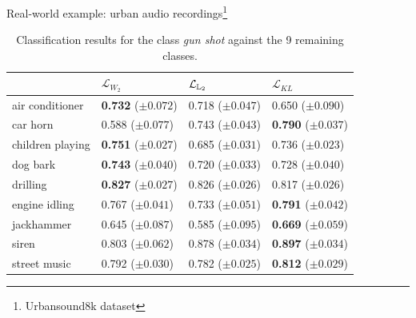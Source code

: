 \documentclass[pdf,aspectratio=169,10pt]{beamer}
\begin{document}
\begin{frame}{Real-world example: urban audio recordings\footnote{Urbansound8k dataset}}
\begin{table}[h!]
\centering
\small
\begin{tabular}{p{2.5cm}p{2.5cm}p{2.5cm}p{2.5cm}} \toprule

                    & $\mathcal{L}_{W_2}$          & $\mathcal{L}_{{\mathbb L}_2}$ & $\mathcal{L}_{KL}$         \\ \midrule 
air conditioner     & \textbf{0.732} ($\pm0.072$)  & 0.718 ($\pm0.047$) & 0.650 ($\pm0.090$)           \\
car horn            & 0.588 ($\pm0.077$)           & 0.743 ($\pm0.043$) & \textbf{0.790} ($\pm0.037$)  \\
children playing    & \textbf{0.751} ($\pm0.027$)  & 0.685 ($\pm0.031$) & 0.736 ($\pm0.023$)           \\ \midrule
dog bark            & \textbf{0.743} ($\pm0.040$)  & 0.720 ($\pm0.033$) & 0.728 ($\pm0.040$)           \\ 
drilling            & \textbf{0.827} ($\pm0.027$)  & 0.826 ($\pm0.026$) & 0.817 ($\pm0.026$)           \\ 
engine idling       & 0.767 ($\pm0.041$)           & 0.733 ($\pm0.051$) & \textbf{0.791} ($\pm0.042$)  \\ \midrule
jackhammer          & 0.645 ($\pm0.087$)           & 0.585 ($\pm0.095$) & \textbf{0.669} ($\pm0.059$)  \\
siren               & 0.803 ($\pm0.062$)           & 0.878 ($\pm0.034$) & \textbf{0.897} ($\pm0.034$)  \\
street music        & 0.792 ($\pm0.030$)           & 0.782 ($\pm0.025$) & \textbf{0.812} ($\pm0.029$)  \\ \bottomrule
\end{tabular}
\vspace{1em}
\caption{Classification results for the class \textit{gun shot} against the 9 remaining classes.}
\end{table}
\end{frame}
\end{document}
